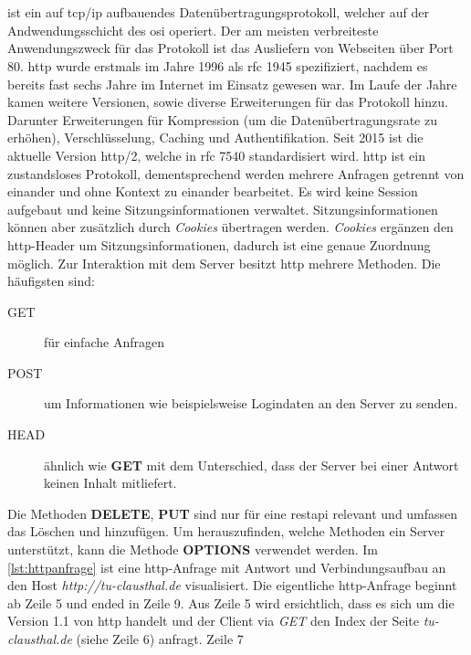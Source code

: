\documentclass[titlepage]{report}
\begin{document}
\section*{}
 ist ein auf \gls{tcp}/\gls{ip} aufbauendes
Datenübertragungsprotokoll, welcher auf der Andwendungsschicht des
\gls{osi} operiert. Der am meisten verbreiteste Anwendungszweck für das
Protokoll ist das Ausliefern von Webseiten über Port 80. \gls{http}
wurde erstmals im Jahre 1996 als \gls{rfc} 1945 spezifiziert, nachdem
es bereits fast sechs Jahre im Internet im Einsatz gewesen
war\cite{RFC1945}. Im Laufe der Jahre kamen weitere Versionen,
sowie diverse Erweiterungen für das Protokoll hinzu. Darunter
Erweiterungen für Kompression (um die Datenübertragungsrate zu erhöhen),
Verschlüsselung, Caching und Authentifikation. Seit 2015 ist die
aktuelle Version \gls{http}/2, welche in \gls{rfc} 7540 standardisiert
wird\cite{RFC7540}. \gls{http} ist ein zustandsloses Protokoll,
dementsprechend werden mehrere Anfragen getrennt von einander und ohne
Kontext zu einander bearbeitet. Es wird keine Session aufgebaut und
keine Sitzungsinformationen verwaltet. Sitzungsinformationen können
aber zusätzlich durch \emph{Cookies} übertragen werden. \emph{Cookies}
ergänzen den \gls{http}\hyp{}Header um Sitzungsinformationen, dadurch
ist eine genaue Zuordnung möglich. Zur Interaktion mit dem Server
besitzt \gls{http} mehrere Methoden. Die häufigsten sind:
\begin{description}
    \item[GET] für einfache Anfragen
    \item[POST] um Informationen wie beispielsweise Logindaten an den
        Server zu senden.
    \item[HEAD] ähnlich wie \textbf{GET} mit dem Unterschied, dass
        der Server bei einer Antwort keinen Inhalt mitliefert.
\end{description}
Die Methoden \textbf{DELETE}, \textbf{PUT} sind nur für eine
\gls{restapi} relevant und umfassen das Löschen und hinzufügen. Um
herauszufinden, welche Methoden ein Server unterstützt, kann die Methode
\textbf{OPTIONS} verwendet werden.
Im \autoref{lst:httpanfrage} ist eine \gls{http}\hyp{}Anfrage mit Antwort und
Verbindungsaufbau an den Host \emph{http://tu-clausthal.de}
visualisiert. Die eigentliche \gls{http}\hyp{}Anfrage beginnt ab Zeile 5
und ended in Zeile 9. Aus Zeile 5 wird ersichtlich, dass es sich um die
Version 1.1 von \gls{http} handelt und der Client via \emph{GET} den
Index der Seite \emph{tu-clausthal.de} (siehe Zeile 6) anfragt. Zeile 7
\end{document}
